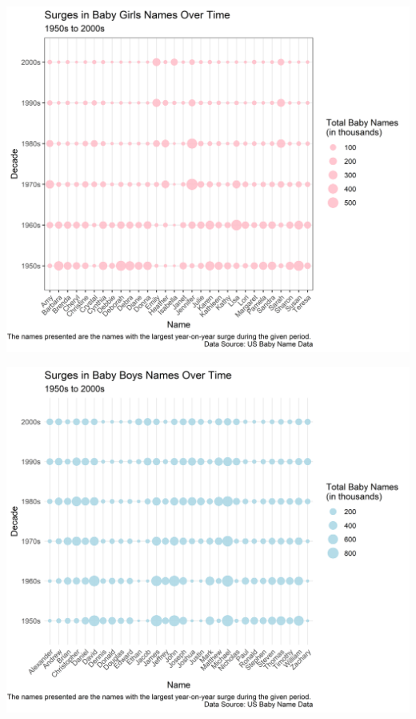 \documentclass[11pt,preprint, authoryear]{elsarticle}
\let\origfigure\figure
\let\endorigfigure\endfigure
\renewenvironment{figure}[1][2] {
    \expandafter\origfigure\expandafter[H]
} {
    \endorigfigure
}
\numberwithin{equation}{section}
\numberwithin{figure}{section}
\numberwithin{table}{section}
\begin{document}
\begin{figure}[H]

{\centering \includegraphics{Question_1_files/figure-latex/Figure2-1} 

}

\caption{Surge in Girls Names \label{Figure2}}\label{fig:Figure2}
\end{figure}

\begin{figure}[H]

{\centering \includegraphics{Question_1_files/figure-latex/Figure3-1} 

}

\caption{Surges in Boys Names \label{Figure3}}\label{fig:Figure3}
\end{figure}
\end{document}
